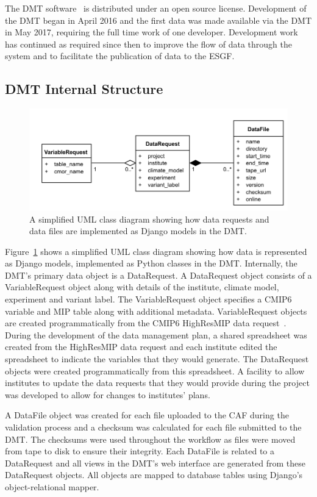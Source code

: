 \documentclass[gmd, manuscript]{copernicus}
\begin{document}
The DMT software~\citep{Seddon2019} is distributed under an open source license. Development of the DMT began in April 2016 and the first data was made available via the DMT in May 2017, requiring the full time work of one developer. Development work has continued as required since then to improve the flow of data through the system and to facilitate the publication of data to the ESGF. 

\subsection{DMT Internal Structure}

\begin{figure}[ht]
	\includegraphics[width=12cm]{fig04.pdf}
	\caption{A simplified UML class diagram showing how data requests and data files are implemented as Django models in the DMT.}
	\label{dmt_struture}
\end{figure}

Figure~\ref{dmt_struture} shows a simplified UML class diagram showing how data is represented as Django models, implemented as Python classes in the DMT. Internally, the DMT's primary data object is a DataRequest. A DataRequest object consists of a VariableRequest object along with details of the institute, climate model, experiment and variant label. The VariableRequest object specifies a CMIP6 variable and MIP table along with additional metadata. VariableRequest objects are created programmatically from the CMIP6 HighResMIP data request~\citep{Juckes2020}. During the development of the data management plan, a shared spreadsheet was created from the HighResMIP data request and each institute edited the spreadsheet to indicate the variables that they would generate. The DataRequest objects were created programmatically from this spreadsheet. A facility to allow institutes to update the data requests that they would provide during the project was developed to allow for changes to institutes' plans.

A DataFile object was created for each file uploaded to the CAF during the validation process and a checksum was calculated for each file submitted to the DMT. The checksums were used throughout the workflow as files were moved from tape to disk to ensure their integrity. Each DataFile is related to a DataRequest and all views in the DMT's web interface are generated from these DataRequest objects. All objects are mapped to database tables using Django's object-relational mapper. 
\end{document}
